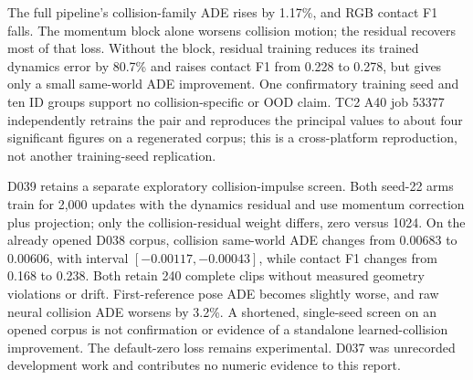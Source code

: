 The full pipeline's collision-family ADE rises by 1.17\%, and RGB contact F1
falls. The momentum block alone worsens collision motion; the residual
recovers most of that loss. Without the block, residual training reduces its
trained dynamics error by 80.7\% and raises contact F1 from 0.228 to 0.278,
but gives only a small same-world ADE improvement. One confirmatory training
seed and ten ID groups support no collision-specific or OOD claim. TC2 A40
job 53377 independently retrains the pair and reproduces the principal values
to about four significant figures on a regenerated corpus; this is a
cross-platform reproduction, not another training-seed replication.

D039 retains a separate exploratory collision-impulse screen. Both seed-22
arms train for 2,000 updates with the dynamics residual and use momentum
correction plus projection; only the collision-residual weight differs, zero
versus 1024. On the already opened D038 corpus, collision same-world ADE
changes from 0.00683 to 0.00606, with interval $[-0.00117,-0.00043]$, while
contact F1 changes from 0.168 to 0.238. Both retain 240 complete clips without
measured geometry violations or drift. First-reference pose ADE becomes
slightly worse, and raw neural collision ADE worsens by 3.2\%. A shortened,
single-seed screen on an opened corpus is not confirmation or evidence of a
standalone learned-collision improvement. The default-zero loss remains
experimental. D037 was unrecorded development work and contributes no numeric
evidence to this report.
